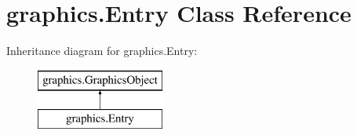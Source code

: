 \hypertarget{classgraphics_1_1_entry}{}\section{graphics.\+Entry Class Reference}
\label{classgraphics_1_1_entry}
Inheritance diagram for graphics.\+Entry\+:\begin{figure}[H]
\begin{center}
\leavevmode
\includegraphics[height=2.000000cm]{classgraphics_1_1_entry}
\end{center}
\end{figure}
